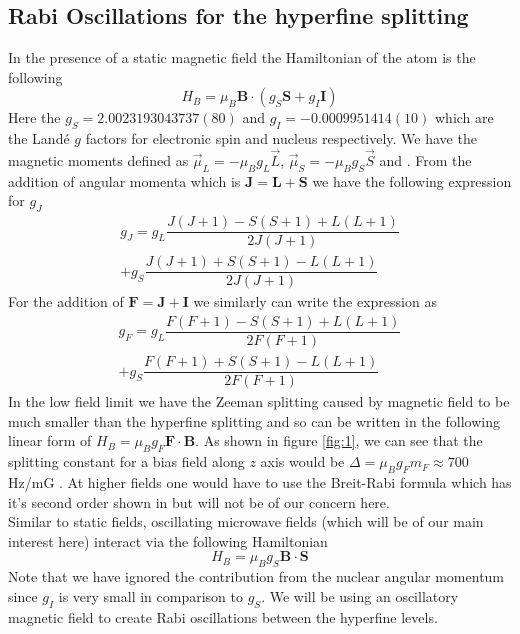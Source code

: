 \documentclass[%
 reprint,
 amsmath,amssymb,
 aps,
]{revtex4-2}
\begin{document}
\subsection{Rabi Oscillations for the hyperfine splitting}
In the presence of a static magnetic field the Hamiltonian of the atom is the following
\begin{equation}
    H_B = \mu_B\textbf{B}\cdot(g_S\textbf{S} + g_I\textbf{I})
\end{equation}
Here the $g_S = 2.0023193043737(80)$ and $g_I = -0.0009951414(10)$ which are the Land\'e $g$ factors for electronic spin and nucleus respectively. We have the magnetic moments defined as $\vec{\mu}_L = -\mu_Bg_L\vec{L}$, $\vec{\mu}_S = -\mu_Bg_S\vec{S}$ and . From the addition of angular momenta which is $\textbf{J} = \textbf{L} + \textbf{S}$ we have the following expression for $g_J$ \cite{book17125}
\begin{eqnarray}
    g_J = g_L\dfrac{J(J+1) - S(S+1) + L(L+1)}{2J(J+1)}\nonumber\\
    +g_S\dfrac{J(J+1) + S(S+1) - L(L+1)}{2J(J+1)}
\end{eqnarray}
For the addition of $\textbf{F} = \textbf{J} + \textbf{I}$ we similarly can write the expression as
\begin{eqnarray}
    g_F = g_L\dfrac{F(F+1) - S(S+1) + L(L+1)}{2F(F+1)}\nonumber\\
    +g_S\dfrac{F(F+1) + S(S+1) - L(L+1)}{2F(F+1)}
\end{eqnarray}
In the low field limit we have the Zeeman splitting caused by magnetic field to be much smaller than the hyperfine splitting and so can be written in the following linear form of $H_B = \mu_Bg_F\textbf{F}\cdot\textbf{B}$. As shown in figure \ref{fig:1}, we can see that the splitting constant for a bias field along $z$ axis would be $\Delta = \mu_Bg_Fm_F \approx 700$ Hz/mG \cite{microwavejoslin}. At higher fields one would have to use the Breit-Rabi formula which has it's second order shown in \cite{rb87dline} but will not be of our concern here.\\
Similar to static fields, oscillating microwave fields (which will be of our main interest here) interact via the following Hamiltonian
\begin{equation}
    H_B = \mu_Bg_S\textbf{B}\cdot\textbf{S}
\end{equation}
Note that we have ignored the contribution from the nuclear angular momentum since $g_I$ is very small in comparison to $g_S$. We will be using an oscillatory magnetic field to create Rabi oscillations between the hyperfine levels.
\end{document}
